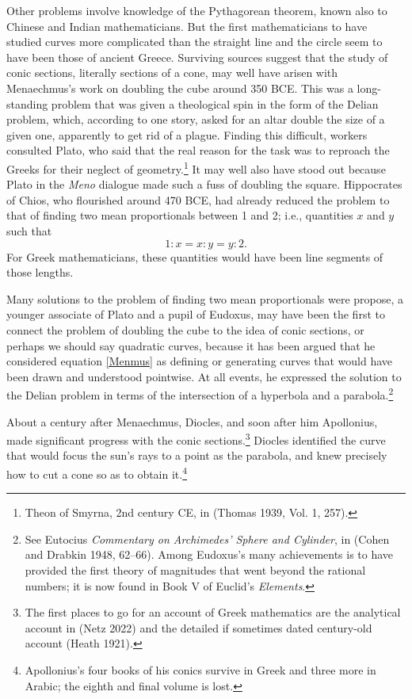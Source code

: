 Other problems involve knowledge of the Pythagorean theorem, known also to Chinese and Indian mathematicians. But the first mathematicians to have studied curves more complicated than the straight line and the circle seem to have been those of ancient Greece.  Surviving sources suggest that the study of conic sections, literally sections of a cone, may well have arisen with Menaechmus's work on doubling the cube around 350 BCE. This was a long-standing problem that was given a theological spin in the form of the Delian problem, which, according to one story, asked for an altar double the size of a given one, apparently to get rid of a plague. Finding this difficult, workers consulted Plato, who said that the real reason for the task was to reproach the Greeks for their neglect of geometry.\footnote{Theon of Smyrna, 2nd century CE, in (Thomas 1939, Vol. 1, 257).}
It may well also have stood out because Plato in the \emph{Meno}
dialogue made such a fuss of doubling the square. Hippocrates of
Chios, who flourished around 470 BCE,  had already reduced the 
problem to that of finding two mean proportionals between 1 and 2; 
i.e., quantities $x$ and $y$ such that 
\begin{equation}\label{Menmus}
1:x= x:y = y: 2.
\end{equation}
For Greek mathematicians, these quantities would have been line segments of those lengths. 

Many solutions to the problem of finding two mean proportionals were propose, a younger associate of Plato and a pupil of Eudoxus, may have been the first to connect the problem of doubling the cube to the idea of conic sections, or perhaps we should say quadratic curves, because it has been argued that he considered equation \eqref{Menmus} as defining or generating curves that would have been drawn and understood pointwise. At all events, he expressed the solution to the Delian problem in terms of the intersection of a hyperbola and a parabola.\footnote{See Eutocius \emph{Commentary on Archimedes' Sphere and Cylinder}, in (Cohen and Drabkin 1948, 62--66). Among Eudoxus's many achievements is to have provided the first theory of magnitudes that went beyond the rational numbers; it is now found in Book V of Euclid's \emph{Elements}.}

About a century after Menaechmus, Diocles, and soon after him Apollonius, made significant progress with the conic sections.\footnote{The first places to go for an account of Greek mathematics are the analytical account in (Netz 2022) and the detailed if sometimes dated century-old account (Heath 1921).}
Diocles identified the curve that would focus the sun's rays to a point as the parabola, and knew precisely how to cut a cone so as to obtain it.\footnote{Apollonius's four books of his conics survive in Greek and three more in Arabic; the eighth and final volume is lost.} 



